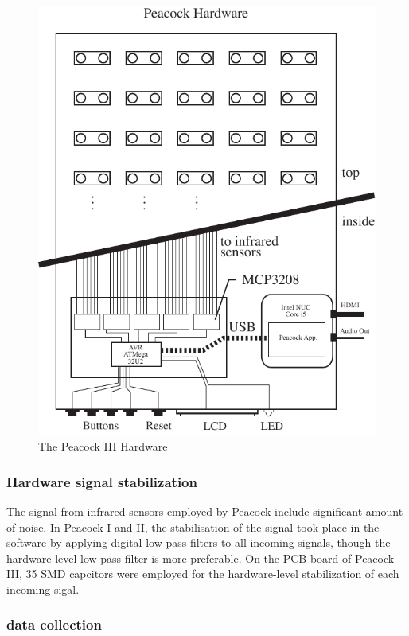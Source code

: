 \documentclass{nime-alternate}
\begin{document}
\begin{figure}[htbp]
       \centering
              \includegraphics[width=1\columnwidth]{Peacock_hardware}
       \caption{The Peacock III Hardware}
       \label{fig:peacock}
\end{figure}


\subsubsection{Hardware signal stabilization} %

The signal from infrared sensors employed by Peacock include significant amount of noise. In Peacock I and II, the stabilisation of the signal took place in the software by applying digital low pass filters to all incoming signals, though the hardware level low pass filter is more preferable. On the PCB board of Peacock III, 35 SMD capcitors were employed for the  hardware-level stabilization of each incoming sigal.

\subsubsection{data collection} %
\end{document}

